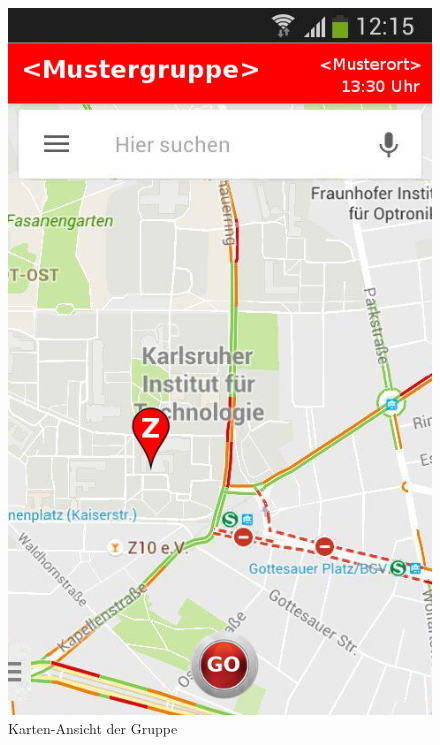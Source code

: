 \begin{figure}
	\caption{Karten-Ansicht der Gruppe}
	\includegraphics[scale =0.5]{resources/images/map.png}
\end{figure}

